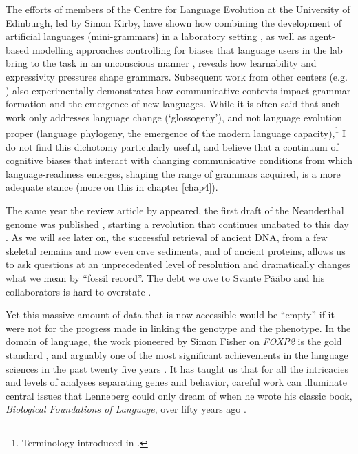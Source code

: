 The efforts of members of the Centre for Language Evolution at the University of Edinburgh, led by Simon Kirby, have shown how combining the development of artificial languages (mini-grammars) in a laboratory setting \citep{kirby2008cumulative,kirby2015compression}, as well as agent-based modelling approaches controlling for biases that language users in the lab bring to the task in an unconscious manner \citep{thompson2016culture}, reveals how learnability and expressivity pressures shape grammars. Subsequent work from other centers (e.g. \cite{raviv2019larger,raviv2020language,raviv2021makes}) also experimentally demonstrates how communicative contexts impact grammar formation and the emergence of new languages. While it is often said that such work only addresses language change (`glossogeny'), and not language evolution proper (language phylogeny, the emergence of the modern language capacity),\footnote{Terminology introduced in \cite{hurford1990nativist}.} I do not find this dichotomy particularly useful, and believe that a continuum of cognitive biases that interact with changing communicative conditions from which language-readiness emerges, shaping the range of grammars acquired, is a more adequate stance (more on this in chapter \ref{chap4}).

The same year the review article by \cite{scott2010language} appeared, the first draft of the Neanderthal genome was published \citep{green2010draft}, starting a revolution that continues unabated to this day \citep{reich2018we}. As we will see later on, the successful retrieval of ancient DNA, from a few skeletal remains and now even cave sediments, and of ancient proteins, allows us to ask questions at an unprecedented level of resolution and dramatically changes what we mean by ``fossil record''. The debt we owe to Svante Pääbo and his collaborators is hard to overstate \citep{paabo2014neanderthal,meyer2012high,prufer2014complete,prufer2017high,mafessoni2020high,slon2017neandertal,vernot2021unearthing,zavala2021pleistocene,welker2016palaeoproteomic,welker2020dental}.

Yet this massive amount of data that is now accessible would be ``empty'' if it were not for the progress made in linking the genotype and the phenotype. In the domain of language, the work pioneered by Simon Fisher on \textit{FOXP2} is the gold standard \citep{lai2001forkhead}, and arguably one of the most significant achievements in the language sciences in the past twenty five years \citep{fisher2009foxp2,fisher2015genetics,fisher2019human,den2021molecular}. It has taught us that for all the intricacies and levels of analyses separating genes and behavior, careful work can illuminate central issues that Lenneberg could only dream of when he wrote his classic book, \textit{Biological Foundations of Language}, over fifty years ago \citep{Lenneberg1967biological}.

